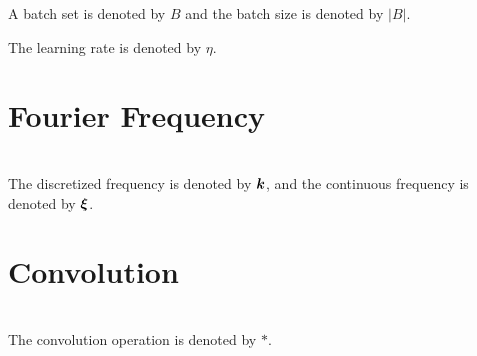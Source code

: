 \documentclass{article}
\begin{document}
A batch set is denoted by $B$ and the batch size is denoted by $|B|$.

The learning rate is denoted by $\eta$.


\section{Fourier Frequency}~\\
The discretized frequency is denoted by $\bm{k}$, and the continuous frequency is denoted by $\bm{\xi}$.

\section{Convolution}~\\
The convolution operation is denoted by $*$.

\newpage
\end{document}
